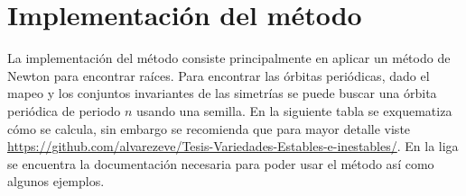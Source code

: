\section{Implementación del método}
La implementaci\'on del m\'etodo consiste principalmente en aplicar un m\'etodo de Newton para encontrar ra\'ices. Para encontrar las \'orbitas peri\'odicas, dado el mapeo y los conjuntos invariantes de las simetr\'ias se puede buscar una \'orbita peri\'odica de periodo $n$ usando una semilla. En la siguiente tabla se exquematiza c\'omo se calcula, sin embargo se recomienda que para mayor detalle viste \url{https://github.com/alvarezeve/Tesis-Variedades-Estables-e-inestables/}.
En la liga se encuentra la documentaci\'on necesaria para poder usar el m\'etodo as\'i como algunos ejemplos. \\
\linebreak
\linebreak
\linebreak
